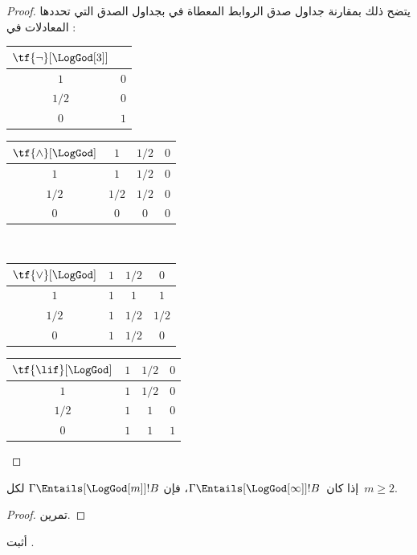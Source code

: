 \documentclass[../../../include/open-logic-section]{subfiles}
\begin{document}
\begin{proof}
  يتضح ذلك بمقارنة جداول صدق الروابط المعطاة في
   بجداول الصدق التي تحددها المعادلات في
  :
  \begin{center}
    \begin{tabular}{c|c}
      $\tf{\lnot}[\LogGod[3]]$ & \\
      \hline
      $1$ & $0$ \\
      $1/2$ & $0$ \\
      $0$ & $1$
    \end{tabular}
    \quad
    \begin{tabular}{c|ccc}
      $\tf{\land}[\LogGod]$ & $1$ & $1/2$ & $0$ \\
      \hline
      $1$ & $1$ & $1/2$ & $0$ \\
      $1/2$ & $1/2$ & $1/2$ & $0$\\
      $0$ & $0$ & $0$ & $0$
    \end{tabular}
    \\[2ex]
    \begin{tabular}{c|ccc}
      $\tf{\lor}[\LogGod]$ & $1$ & $1/2$ & $0$ \\
      \hline
      $1$ & $1$ & $1$ & $1$ \\
      $1/2$ & $1$ & $1/2$ & $1/2$ \\
      $0$ & $1$ & $1/2$ & $0$
    \end{tabular}
    \quad
    \begin{tabular}{c|ccc}
      $\tf{\lif}[\LogGod]$ & $1$ & $1/2$ & $0$ \\
      \hline
      $1$ & $1$ & $1/2$ & $0$ \\
      $1/2$ & $1$ & $1$ & $0$  \\
      $0$ & $1$ & $1$ & $1$
    \end{tabular}
  \end{center}
\end{proof}

\begin{prop}
  إذا كان~$\Gamma \Entails[\LogGod[\infty]] !B$، فإن
  $\Gamma \Entails[\LogGod[m]] !B$ لكل~$m \ge 2$.
\end{prop}

\begin{proof}
  تمرين.
\end{proof}

\begin{prob}
  أثبت .
\end{prob}
\end{document}
